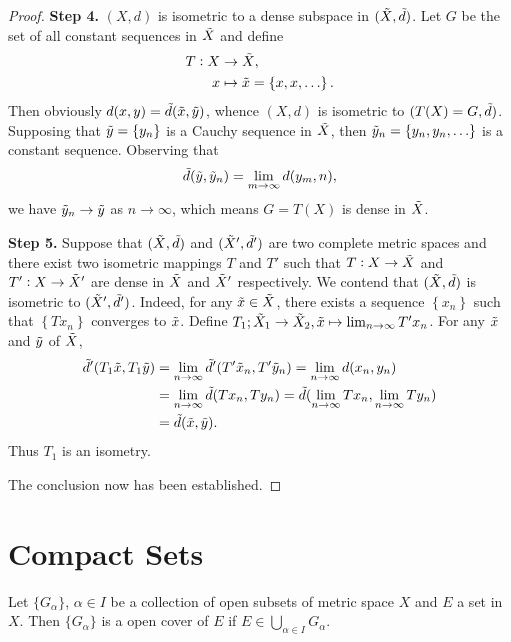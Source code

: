 \begin{proof}
\textbf{Step 4.}
$(X, d)$ is isometric to a dense subspace in $(\tilde{X}, \tilde{d})$. 
Let $G$ be the set of all constant sequences in $\tilde{X}$ and define 
\begin{equation*}
    \begin{aligned}
        T: X &\to \tilde{X},  \\
        x &\mapsto \tilde{x} = \left\{ x, x, \ldots \right\}. 
    \end{aligned}
\end{equation*}
Then obviously $d(x, y) = \tilde{d}(\tilde{x}, \tilde{y})$, whence $(X, d)$ is isometric to 
$(T(X) = G, \tilde{d})$. 
Supposing that $\tilde{y} = \left\{ y_n\right\}$ is a Cauchy sequence in $\tilde{X}$, 
then $\tilde{y}_n = \left\{ y_n, y_n, \ldots \right\}$ is a constant sequence. 
Observing that 
\begin{equation*}
    \tilde{d}(\tilde{y}, \tilde{y}_n) = \lim_{m \to \infty} d(y_m, n), 
\end{equation*}
we have $\tilde{y}_n \to \tilde{y}$ as $n \to \infty$, which means $G = T(X)$ is dense 
in $\tilde{X}$. 

\textbf{Step 5.}
Suppose that $(\tilde{X}, \tilde{d})$ and $(\tilde{X}', \tilde{d}')$ are two complete metric spaces 
and there exist two isometric mappings $T$ and $T'$ such that $T: X \to \tilde{X}$ 
and $T': X \to \tilde{X}'$ are dense in $\tilde{X}$ and $\tilde{X}'$ respectively. 
We contend that $(\tilde{X}, \tilde{d})$ is isometric to $(\tilde{X}', \tilde{d}')$. 
Indeed, for any $\tilde{x} \in \tilde{X}$, there exists a sequence $\left\{ x_n\right\}$ 
such that $\left\{ Tx_n \right\}$ converges to $\tilde{x}$. 
Define $T_1; \tilde{X}_1 \to \tilde{X}_2, \tilde{x} \mapsto \lim_{n \to \infty} T'x_n$. 
For any $\tilde{x}$ and $\tilde{y}$ of $\tilde{X}$, 
\begin{equation*}
    \begin{aligned}
        \tilde{d}'(T_1\tilde{x}, T_1\tilde{y}) &= \lim_{n \to \infty} \tilde{d}'(T'\tilde{x}_n, T'\tilde{y}_n)
        = \lim_{n \to \infty} d(x_n, y_n) \\ 
        &= \lim_{n \to \infty} \tilde{d}(Tx_n, Ty_n) 
        = \tilde{d}(\lim_{n \to \infty}Tx_n, \lim_{n \to \infty}Ty_n) \\ 
        &= \tilde{d}(\tilde{x}, \tilde{y}). 
    \end{aligned}
\end{equation*}
Thus $T_1$ is an isometry. 

The conclusion now has been established. 
\end{proof}

\section{Compact Sets}
\begin{defn}
Let $\{G_\alpha\}$, $\alpha \in I$ be a collection of open subsets of 
metric space $X$ and $E$ a set in $X$. 
Then $\{G_\alpha\}$ is a open cover of $E$ if $E \in \bigcup_{\alpha \in I} 
G_\alpha$. 
\end{defn}



